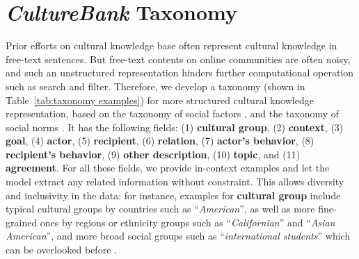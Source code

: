 \documentclass{article} %
\newcommand{\dataname}{\textit{CultureBank}\xspace}
\begin{document}
\vspace{-1em}
\section{\dataname Taxonomy}
Prior efforts on cultural knowledge base \citep{candle2023} often represent cultural knowledge in free-text sentences. But free-text contents on online communities are often noisy, and such an unstructured representation hinders further computational operation such as search and filter. Therefore, we develop a taxonomy (shown in Table~\ref{tab:taxonomy examples}) for more structured cultural knowledge representation, based on the taxonomy of social factors \citep{hovy-yang-2021-importance}, and the taxonomy of social norms \citep{ziems-etal-2023-normbank, goffman2002presentation}. It has the following fields: (1) \textbf{cultural group}, (2) \textbf{context}, (3) \textbf{goal}, (4) \textbf{actor}, (5) \textbf{recipient}, (6) \textbf{relation}, (7) \textbf{actor's behavior}, (8) \textbf{recipient's behavior}, (9) \textbf{other description}, (10) \textbf{topic}, and (11) \textbf{agreement}. For all these fields, we provide in-context examples and let the model extract any related information without constraint. This allows diversity and inclusivity in the data: for instance, examples for \textbf{cultural group} include typical cultural groups by countries such as ``\textit{American}'', as well as more fine-grained ones by regions or ethnicity groups such as ``\textit{Californian}'' and ``\textit{Asian American}'', and more broad social groups such as ``\textit{international students}'' which can be overlooked before \citep{barth2010introduction, stenou2002unesco}. %
    
\end{document}

